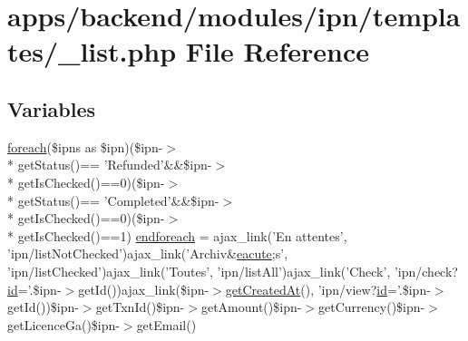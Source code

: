 \hypertarget{backend_2modules_2ipn_2templates_2__list_8php}{\section{apps/backend/modules/ipn/templates/\-\_\-list.php File Reference}
\label{backend_2modules_2ipn_2templates_2__list_8php}
}
\subsection*{Variables}
\begin{DoxyCompactItemize}
\item 
\hyperlink{presse_2modules_2news_2templates_2index_success_8php_abc56db52b2e9a59bcd5c9e45ac5cb332}{foreach}(\$ipns as \$ipn)(\$ipn-\/$>$\\*
get\-Status()== 'Refunded'\&\&\$ipn-\/$>$\\*
get\-Is\-Checked()==0)(\$ipn-\/$>$\\*
get\-Status()== 'Completed'\&\&\$ipn-\/$>$\\*
get\-Is\-Checked()==0)(\$ipn-\/$>$\\*
get\-Is\-Checked()==1) \hyperlink{backend_2modules_2ipn_2templates_2__list_8php_a72953b94e473f2acdb8e60afffbea923}{endforeach} = ajax\-\_\-link('En attentes', 'ipn/list\-Not\-Checked')ajax\-\_\-link('Archiv\&\hyperlink{presse_2modules_2page_2templates_2concours_ouikos_success_8php_a5c9a34c76cebfd8ae481fa185a4530af}{eacute};s', 'ipn/list\-Checked')ajax\-\_\-link('Toutes', 'ipn/list\-All')ajax\-\_\-link('Check', 'ipn/check?\hyperlink{live_2modules_2team_2templates_2management_success_8php_ad9851c94d15b310fef9eaded57c23ddf}{id}='.\$ipn-\/$>$get\-Id())ajax\-\_\-link(\$ipn-\/$>$\hyperlink{live_2modules_2news_2templates_2view_success_8php_a684dd27287fcedcbe91ff8c7cc23f3bb}{get\-Created\-At}(), 'ipn/view?\hyperlink{live_2modules_2team_2templates_2management_success_8php_ad9851c94d15b310fef9eaded57c23ddf}{id}='.\$ipn-\/$>$get\-Id())\$ipn-\/$>$get\-Txn\-Id()\$ipn-\/$>$get\-Amount()\$ipn-\/$>$get\-Currency()\$ipn-\/$>$get\-Licence\-Ga()\$ipn-\/$>$get\-Email()
\end{DoxyCompactItemize}


